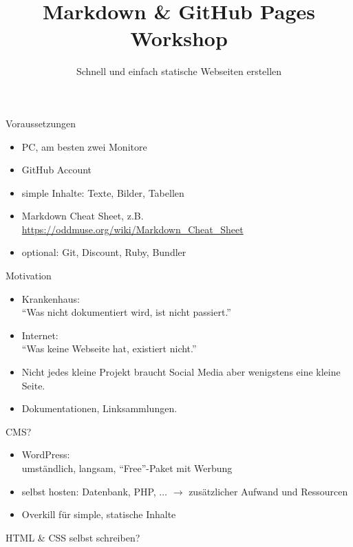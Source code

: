 \documentclass[14pt,aspectratio=1610]{beamer}
\title{Markdown \& GitHub Pages Workshop}
\subtitle{Schnell und einfach statische Webseiten erstellen}
\begin{document}
\begin{frame}
\titlepage
\end{frame}

\begin{frame}{Voraussetzungen}
\begin{itemize}
\item PC, am besten zwei Monitore
\item GitHub Account
\item simple Inhalte: Texte, Bilder, Tabellen
\item Markdown Cheat Sheet, z.B. \url{https://oddmuse.org/wiki/Markdown\_Cheat\_Sheet}
\item optional: Git, Discount, Ruby, Bundler
\end{itemize}
\end{frame}

\begin{frame}{Motivation}
\begin{itemize}
\item Krankenhaus:\\\enquote{Was nicht dokumentiert wird, ist nicht passiert.}
\item Internet:\\\enquote{Was keine Webseite hat, existiert nicht.}
\item Nicht jedes kleine Projekt braucht Social Media aber wenigstens eine kleine Seite.
\item Dokumentationen, Linksammlungen.
\end{itemize}
\end{frame}

\begin{frame}{CMS?}
\begin{itemize}
\item WordPress:\\umständlich, langsam, \enquote{Free}-Paket mit Werbung
\item selbst hosten: Datenbank, PHP, $\ldots$ $\rightarrow$ zusätzlicher Aufwand und Ressourcen
\item Overkill für simple, statische Inhalte
\end{itemize}
\end{frame}

\begin{frame}{HTML \& CSS selbst schreiben?}
\scriptsize

\end{frame}
\end{document}
